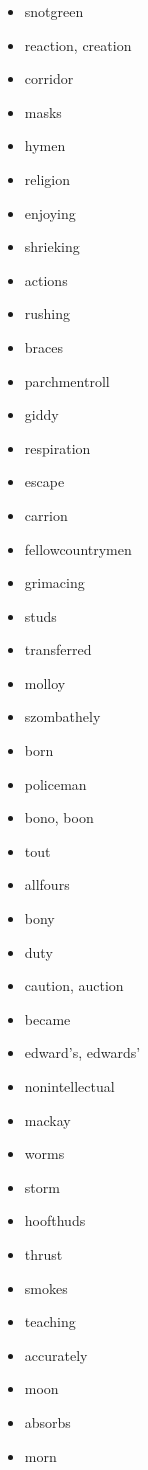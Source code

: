 \documentclass{article}
\begin{document}
\begin{itemize}
    \item snotgreen
    \item reaction, creation
    \item corridor
    \item masks
    \item hymen
    \item religion
    \item enjoying
    \item shrieking
    \item actions
    \item rushing
    \item braces
    \item parchmentroll
    \item giddy
    \item respiration
    \item escape
    \item carrion
    \item fellowcountrymen
    \item grimacing
    \item studs
    \item transferred
    \item molloy
    \item szombathely
    \item born
    \item policeman
    \item bono, boon
    \item tout
    \item allfours
    \item bony
    \item duty
    \item caution, auction
    \item became
    \item edward's, edwards'
    \item nonintellectual
    \item mackay
    \item worms
    \item storm
    \item hoofthuds
    \item thrust
    \item smokes
    \item teaching
    \item accurately
    \item moon
    \item absorbs
    \item morn

\end{itemize}
\end{document}
